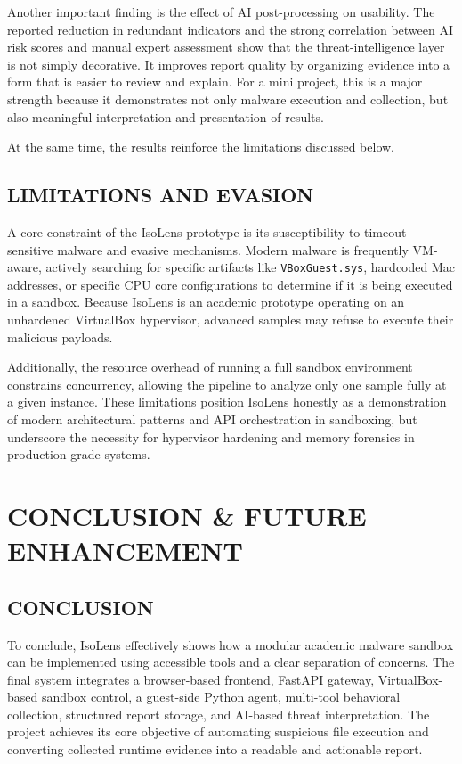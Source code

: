 \documentclass[a4paper,12pt,oneside]{report}
\begin{document}
\par

\par

Another important finding is the effect of AI post-processing on usability. The reported reduction in redundant indicators and the strong correlation between AI risk scores and manual expert assessment show that the threat-intelligence layer is not simply decorative. It improves report quality by organizing evidence into a form that is easier to review and explain. For a mini project, this is a major strength because it demonstrates not only malware execution and collection, but also meaningful interpretation and presentation of results.

At the same time, the results reinforce the limitations discussed below.

\section{LIMITATIONS AND EVASION}
A core constraint of the IsoLens prototype is its susceptibility to timeout-sensitive malware and evasive mechanisms. Modern malware is frequently VM-aware, actively searching for specific artifacts like \texttt{VBoxGuest.sys}, hardcoded Mac addresses, or specific CPU core configurations to determine if it is being executed in a sandbox. Because IsoLens is an academic prototype operating on an unhardened VirtualBox hypervisor, advanced samples may refuse to execute their malicious payloads. 

\par

\par

Additionally, the resource overhead of running a full sandbox environment constrains concurrency, allowing the pipeline to analyze only one sample fully at a given instance. These limitations position IsoLens honestly as a demonstration of modern architectural patterns and API orchestration in sandboxing, but underscore the necessity for hypervisor hardening and memory forensics in production-grade systems.

\chapter{CONCLUSION \& FUTURE ENHANCEMENT}
\section{CONCLUSION}
To conclude, IsoLens effectively shows how a modular academic malware sandbox can be implemented using accessible tools and a clear separation of concerns. The final system integrates a browser-based frontend, FastAPI gateway, VirtualBox-based sandbox control, a guest-side Python agent, multi-tool behavioral collection, structured report storage, and AI-based threat interpretation. The project achieves its core objective of automating suspicious file execution and converting collected runtime evidence into a readable and actionable report.
\end{document}
